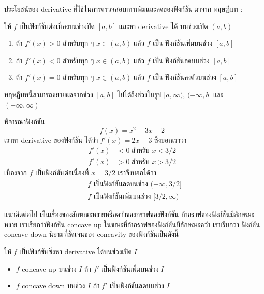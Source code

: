 \documentclass[
]{book}
\begin{document}
ประโยชน์ของ derivative ที่ใช้ในการตรวจสอบการเพิ่มและลดของฟังก์ชัน มาจาก ทฤษฏีบท :

ให้ \(f\) เป็นฟังก์ชันต่อเนื่องบนช่วงปิด \([a,b]\) และหา derivative ได้ บนช่วงเปิด
\((a,b)\)

\begin{enumerate}
\def\labelenumi{\arabic{enumi}.}
\item
  ถ้า \(f'(x) > 0\) สำหรับทุก ๆ \(x \in (a,b)\) แล้ว \(f\) เป็น ฟังก์ชันเพิ่มบนช่วง
  \([a,b]\)
\item
  ถ้า \(f'(x) < 0\) สำหรับทุก ๆ \(x \in (a,b)\) แล้ว \(f\) เป็น ฟังก์ชันลดบนช่วง
  \([a,b]\)
\item
  ถ้า \(f'(x) = 0\) สำหรับทุก ๆ \(x \in (a,b)\) แล้ว \(f\) เป็น
  ฟังก์ชันคงตัวบนช่วง \([a,b]\)
\end{enumerate}

ทฤษฏีบทนี้สามารถขยายผลจากช่วง \([a,b]\) ไปได้ถึงช่วงในรูป \([a,\infty)\),
\((-\infty,b]\) และ \((-\infty,\infty)\)

พิจารณาฟังก์ชัน \[f(x) = x^2-3x+2\] เราหา derivative ของฟังก์ชัน ได้ว่า
\(f'(x) = 2x-3\) ซึ่งบอกเราว่า \begin{equation}   \begin{aligned}
    f'(x) &< 0 \text{ สำหรับ $x < 3/2$} \\
    f'(x) &> 0 \text{ สำหรับ $x > 3/2$}
  \end{aligned} \end{equation} เนื่องจาก \(f\) เป็นฟังก์ชันต่อเนื่องที่ \(x=3/2\)
เราจึงบอกได้ว่า \begin{equation}   \begin{aligned}
    \text{ $f$ เป็นฟังก์ชันลดบนช่วง $(-\infty,3/2]$} \\
    \text{ $f$ เป็นฟังก์ชันเพิ่มบนช่วง $[3/2,\infty)$}
  \end{aligned} \end{equation}

แนวคิดต่อไป เป็นเรื่องของลักษณะหงายหรือคว่ำของกราฟของฟังก์ชัน
ถ้ากราฟของฟังก์ชันมีลักษณะหงาย เราเรียกว่าฟังก์ชัน concave up
ในขณะที่ถ้ากราฟของฟังก์ชันมีลักษณะคว่ำ เราเรียกว่า ฟังก์ชัน concave down นิยามที่ชัดเจนของ
concavity ของฟังก์ชันเป็นดังนี้

ให้ \(f\) เป็นฟังก์ชันซึ่งหา derivative ได้บนช่วงเปิด \(I\)

\begin{itemize}
\item
  \(f\) concave up บนช่วง \(I\) ถ้า \(f'\) เป็นฟังก์ชันเพิ่มบนช่วง \(I\)
\item
  \(f\) concave down บนช่วง \(I\) ถ้า \(f'\) เป็นฟังก์ชันลดบนช่วง \(I\)
\end{itemize}
\end{document}
